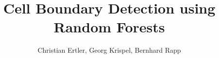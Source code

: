 \documentclass[fontsize=12pt, titlepage, bibliography=totoc, listof=totoc]{scrartcl}
\begin{document}
\author{Christian Ertler, Georg Krispel, Bernhard Rapp}
\title{Cell Boundary Detection using Random Forests}
\subject{Medical Image Analysis, Design Practical}

\maketitle
\tableofcontents



%




\newpage

{}

\end{document}
